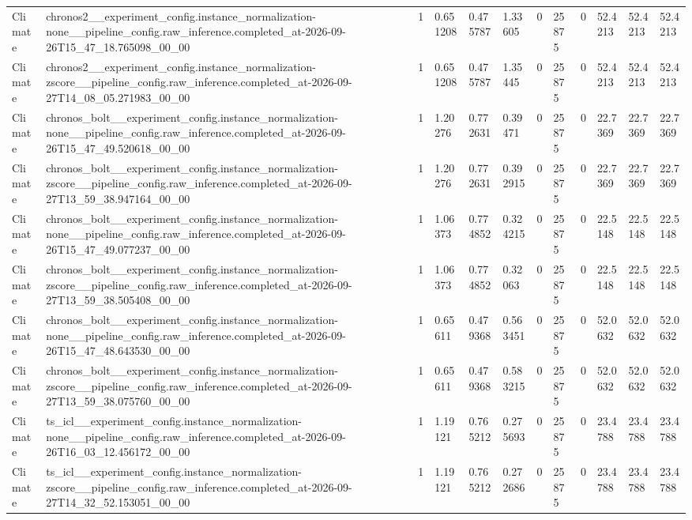 \begin{tabular}{llllllllllll}
Climate & chronos2\_\_experiment\_config.instance\_normalization-none\_\_pipeline\_config.raw\_inference.completed\_at-2026-09-26T15\_47\_18.765098\_00\_00 & 1 & 0.651208 & 0.475787 & 1.33605 & 0 & 25875 & 0 & 52.4213 & 52.4213 & 52.4213 \\
Climate & chronos2\_\_experiment\_config.instance\_normalization-zscore\_\_pipeline\_config.raw\_inference.completed\_at-2026-09-27T14\_08\_05.271983\_00\_00 & 1 & 0.651208 & 0.475787 & 1.35445 & 0 & 25875 & 0 & 52.4213 & 52.4213 & 52.4213 \\
Climate & chronos\_bolt\_\_experiment\_config.instance\_normalization-none\_\_pipeline\_config.raw\_inference.completed\_at-2026-09-26T15\_47\_49.520618\_00\_00 & 1 & 1.20276 & 0.772631 & 0.39471 & 0 & 25875 & 0 & 22.7369 & 22.7369 & 22.7369 \\
Climate & chronos\_bolt\_\_experiment\_config.instance\_normalization-zscore\_\_pipeline\_config.raw\_inference.completed\_at-2026-09-27T13\_59\_38.947164\_00\_00 & 1 & 1.20276 & 0.772631 & 0.392915 & 0 & 25875 & 0 & 22.7369 & 22.7369 & 22.7369 \\
Climate & chronos\_bolt\_\_experiment\_config.instance\_normalization-none\_\_pipeline\_config.raw\_inference.completed\_at-2026-09-26T15\_47\_49.077237\_00\_00 & 1 & 1.06373 & 0.774852 & 0.324215 & 0 & 25875 & 0 & 22.5148 & 22.5148 & 22.5148 \\
Climate & chronos\_bolt\_\_experiment\_config.instance\_normalization-zscore\_\_pipeline\_config.raw\_inference.completed\_at-2026-09-27T13\_59\_38.505408\_00\_00 & 1 & 1.06373 & 0.774852 & 0.32063 & 0 & 25875 & 0 & 22.5148 & 22.5148 & 22.5148 \\
Climate & chronos\_bolt\_\_experiment\_config.instance\_normalization-none\_\_pipeline\_config.raw\_inference.completed\_at-2026-09-26T15\_47\_48.643530\_00\_00 & 1 & 0.65611 & 0.479368 & 0.563451 & 0 & 25875 & 0 & 52.0632 & 52.0632 & 52.0632 \\
Climate & chronos\_bolt\_\_experiment\_config.instance\_normalization-zscore\_\_pipeline\_config.raw\_inference.completed\_at-2026-09-27T13\_59\_38.075760\_00\_00 & 1 & 0.65611 & 0.479368 & 0.583215 & 0 & 25875 & 0 & 52.0632 & 52.0632 & 52.0632 \\
Climate & ts\_icl\_\_experiment\_config.instance\_normalization-none\_\_pipeline\_config.raw\_inference.completed\_at-2026-09-26T16\_03\_12.456172\_00\_00 & 1 & 1.19121 & 0.765212 & 0.275693 & 0 & 25875 & 0 & 23.4788 & 23.4788 & 23.4788 \\
Climate & ts\_icl\_\_experiment\_config.instance\_normalization-zscore\_\_pipeline\_config.raw\_inference.completed\_at-2026-09-27T14\_32\_52.153051\_00\_00 & 1 & 1.19121 & 0.765212 & 0.272686 & 0 & 25875 & 0 & 23.4788 & 23.4788 & 23.4788 \\

\end{tabular}

